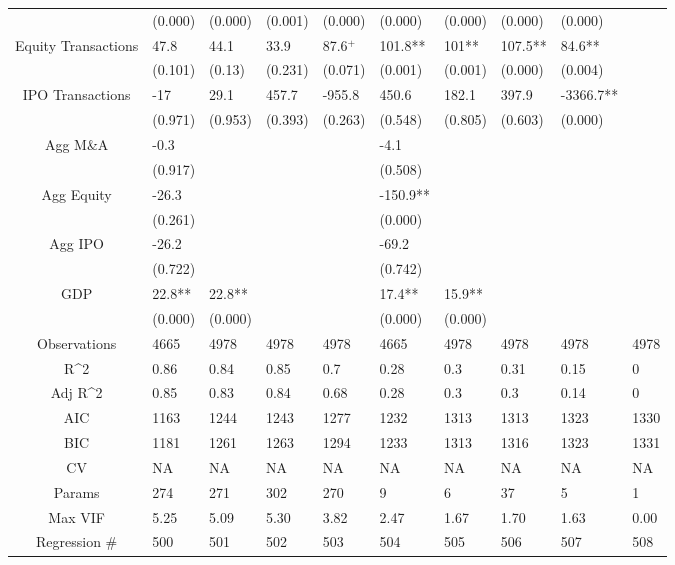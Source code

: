 \documentclass{article}
\begin{document}
\begin{table}[H]
\begin{tabular}{|clllllllll|}
   & (0.000) & (0.000) & (0.001) & (0.000) & (0.000) & (0.000) & (0.000) & (0.000) &  \\ 
  Equity Transactions & 47.8 & 44.1 & 33.9 & 87.6$^{+}$ & 101.8** & 101** & 107.5** & 84.6** &  \\ 
   & (0.101) & (0.13) & (0.231) & (0.071) & (0.001) & (0.001) & (0.000) & (0.004) &  \\ 
  IPO Transactions & -17 & 29.1 & 457.7 & -955.8 & 450.6 & 182.1 & 397.9 & -3366.7** &  \\ 
   & (0.971) & (0.953) & (0.393) & (0.263) & (0.548) & (0.805) & (0.603) & (0.000) &  \\ 
  Agg M\&A & -0.3 &  &  &  & -4.1 &  &  &  &  \\ 
   & (0.917) &  &  &  & (0.508) &  &  &  &  \\ 
  Agg Equity & -26.3 &  &  &  & -150.9** &  &  &  &  \\ 
   & (0.261) &  &  &  & (0.000) &  &  &  &  \\ 
  Agg IPO & -26.2 &  &  &  & -69.2 &  &  &  &  \\ 
   & (0.722) &  &  &  & (0.742) &  &  &  &  \\ 
  GDP & 22.8** & 22.8** &  &  & 17.4** & 15.9** &  &  &  \\ 
   & (0.000) & (0.000) &  &  & (0.000) & (0.000) &  &  &  \\ 
  \hline 
 Observations & 4665 & 4978 & 4978 & 4978 & 4665 & 4978 & 4978 & 4978 & 4978 \\ 
  R^2 & 0.86 & 0.84 & 0.85 & 0.7 & 0.28 & 0.3 & 0.31 & 0.15 & 0 \\ 
  Adj R^2 & 0.85 & 0.83 & 0.84 & 0.68 & 0.28 & 0.3 & 0.3 & 0.14 & 0 \\ 
  AIC & 1163 & 1244 & 1243 & 1277 & 1232 & 1313 & 1313 & 1323 & 1330 \\ 
  BIC & 1181 & 1261 & 1263 & 1294 & 1233 & 1313 & 1316 & 1323 & 1331 \\ 
  CV & NA & NA & NA & NA & NA & NA & NA & NA & NA \\ 
  Params & 274 & 271 & 302 & 270 & 9 & 6 & 37 & 5 & 1 \\ 
  Max VIF & 5.25 & 5.09 & 5.30 & 3.82 & 2.47 & 1.67 & 1.70 & 1.63 & 0.00 \\ 
  Regression \# & 500 & 501 & 502 & 503 & 504 & 505 & 506 & 507 & 508 \\ 
   \hline
\end{tabular}
 
\end{table}
\end{document}
